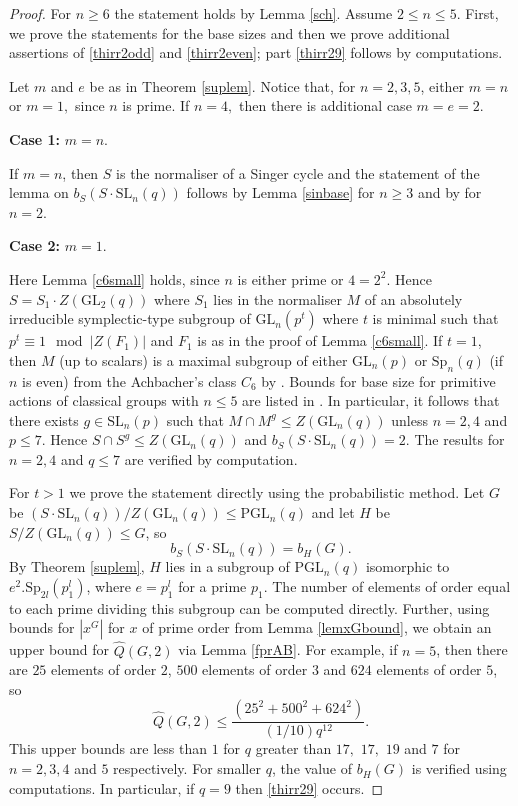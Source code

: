 \documentclass[a4paper,reqno,11pt]{amsart}
\theoremstyle{definition}
\theoremstyle{remark}
\numberwithin{equation}{section}
\newcommand{\SL}{{\mathrm{SL}}}
\newcommand{\GL}{{\mathrm{GL}}}
\newcommand{\PGL}{{\mathrm{PGL}}}
\newcommand{\Sp}{{\mathrm{Sp}}}
\begin{document}
\begin{proof}
For $n \ge 6$ the statement holds by Lemma \ref{sch}. Assume $2 \le n \le 5$. First, we prove the statements for the base sizes and then we prove additional assertions of \ref{thirr2odd} and \ref{thirr2even}; part \ref{thirr29} follows by computations.

Let $m$ and $e$ be as in Theorem \ref{suplem}. Notice that, for $n=2,3,5$, either $m=n$ or $m=1,$ since $n$ is prime. If $n=4,$ then there is additional  case $m=e=2.$

\medskip

{\bf Case 1:} $m=n.$

 If $m=n$, then $S$ is the normaliser of a Singer cycle and the statement of the lemma on $b_S(S \cdot \SL_n(q))$ follows by Lemma \ref{sinbase} for $n \ge 3$ and by \cite[Proposition 4.1]{burPS} for $n=2$.

\medskip

{\bf Case 2:} $m=1.$ 

Here  Lemma \ref{c6small} holds, since $n$ is either prime or $4=2^2$. Hence  $S= S_1 \cdot Z(\GL_2(q))$ where $S_1$ lies in the normaliser  $M$ of an absolutely irreducible symplectic-type subgroup of $\GL_n(p^t)$ where $t$ is minimal such that $p^t \equiv 1 \mod |Z(F_1)|$ and $F_1$ is as in the proof of Lemma \ref{c6small}. If  $t=1$, then $M$ (up to scalars) is a maximal subgroup of either $\GL_n(p)$ or $\Sp_{n}(q)$ (if $n$ is even) from the Achbacher's class $\mathit{C}_6$ by \cite[Table 4.6.B]{kleidlieb}. Bounds for base size for primitive actions of  classical groups with $n \le 5$ are listed in \cite[Tables 2 and 3]{burness}. In particular, it follows that there exists $g \in \SL_n(p)$ such that $M \cap M^g \le Z(\GL_n(q))$ unless $n=2,4$ and $p \le 7.$ Hence  $S \cap S^g \le Z(\GL_n(q))$ and  $b_S(S \cdot \SL_n(q))=2$.  The results for $n=2,4$ and $q \le 7$ are verified by computation.

For $t >1$ we prove the statement directly using the probabilistic method. Let   $G$  be $(S \cdot \SL_n(q))/Z(\GL_n(q))\le \PGL_n(q)$ and let $H$ be $S/Z(\GL_n(q))\le G$, so 
$$b_S(S \cdot \SL_n(q))=b_H(G).$$ 
 By Theorem \ref{suplem}, $H$ lies in a subgroup of $\PGL_n(q)$ isomorphic to $e^{2}.\Sp_{2l}(p_1^l)$, where $e=p_1^l$ for a prime $p_1$. The number of elements of order equal to each  prime dividing this subgroup can be computed directly. Further,
  using bounds for $|x^G|$ for $x$ of prime order from Lemma \ref{lemxGbound}, we obtain an upper bound for $\widehat{Q}(G,2)$ via Lemma \ref{fprAB}. For example, if $n=5$, then
  there are   $25$ elements of order $2$, $500$ elements of order $3$ and $624$ elements of order $5$, so 
$$\widehat{Q}(G,2)\le \frac{(25^2+500^2+624^2)}{(1/10)q^{12}}.$$ 
 This upper bounds are less than $1$ for $q$ greater than $17,$ $17,$ $19$ and $7$ for $n=2,3,4$ and $5$ respectively. For smaller $q$, the value of $b_H(G)$ is verified using computations. In particular, if $q=9$ then \ref{thirr29} occurs.   
 

\end{proof}
\end{document}
